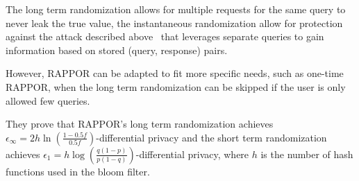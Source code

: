 The long term randomization allows for multiple requests for the same query to
never leak the true value, the instantaneous randomization allow for protection
against the attack described above~\cite{mcsherry2007mechanism} that leverages
separate queries to gain information based on stored (query, response) pairs.

However, RAPPOR can be adapted to fit more specific needs, such as one-time
RAPPOR, when the long term randomization can be skipped if the user is only
allowed few queries.

They prove that RAPPOR's long term randomization achieves $\epsilon_\infty = 2h
\ln\left(\frac{1-0.5 f}{0.5f}\right)$-differential privacy and  the short term
randomization achieves $\epsilon_1 =
h\log\left(\frac{q(1-p)}{p(1-q)}\right)$-differential privacy, where $h$ is the
number of hash functions used in the bloom filter.